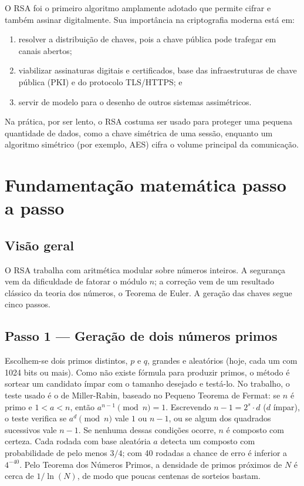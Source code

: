 \documentclass[11pt, a4paper]{article}
\begin{document}
O RSA foi o primeiro algoritmo amplamente adotado que permite cifrar e também assinar digitalmente. Sua importância na criptografia moderna está em:
\begin{enumerate}[label=(\roman*)]
    \item resolver a distribuição de chaves, pois a chave pública pode trafegar em canais abertos;
    \item viabilizar assinaturas digitais e certificados, base das infraestruturas de chave pública (PKI) e do protocolo TLS/HTTPS; e
    \item servir de modelo para o desenho de outros sistemas assimétricos.
\end{enumerate}
Na prática, por ser lento, o RSA costuma ser usado para proteger uma pequena quantidade de dados, como a chave simétrica de uma sessão, enquanto um algoritmo simétrico (por exemplo, AES) cifra o volume principal da comunicação.

\section{Fundamentação matemática passo a passo}

\subsection{Visão geral}
O RSA trabalha com aritmética modular sobre números inteiros. A segurança vem da dificuldade de fatorar o módulo $n$; a correção vem de um resultado clássico da teoria dos números, o Teorema de Euler. A geração das chaves segue cinco passos.

\subsection{Passo 1 --- Geração de dois números primos}
Escolhem-se dois primos distintos, $p$ e $q$, grandes e aleatórios (hoje, cada um com 1024 bits ou mais). Como não existe fórmula para produzir primos, o método é sortear um candidato ímpar com o tamanho desejado e testá-lo. No trabalho, o teste usado é o de Miller-Rabin, baseado no Pequeno Teorema de Fermat: se $n$ é primo e $1 < a < n$, então $a^{n-1} \pmod n = 1$. Escrevendo $n-1 = 2^s \cdot d$ ($d$ ímpar), o teste verifica se $a^d \pmod n$ vale $1$ ou $n-1$, ou se algum dos quadrados sucessivos vale $n-1$. Se nenhuma dessas condições ocorre, $n$ é composto com certeza. Cada rodada com base aleatória $a$ detecta um composto com probabilidade de pelo menos $3/4$; com 40 rodadas a chance de erro é inferior a $4^{-40}$. Pelo Teorema dos Números Primos, a densidade de primos próximos de $N$ é cerca de $1/\ln(N)$, de modo que poucas centenas de sorteios bastam.
\end{document}
